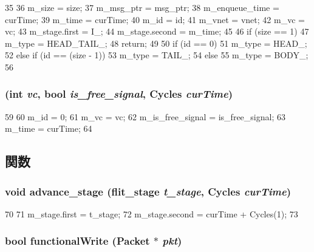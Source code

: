 \begin{DoxyCode}
35 {
36     m_size = size;
37     m_msg_ptr = msg_ptr;
38     m_enqueue_time = curTime;
39     m_time = curTime;
40     m_id = id;
41     m_vnet = vnet;
42     m_vc = vc;
43     m_stage.first = I_;
44     m_stage.second = m_time;
45 
46     if (size == 1) {
47         m_type = HEAD_TAIL_;
48         return;
49     }
50     if (id == 0)
51         m_type = HEAD_;
52     else if (id == (size - 1))
53         m_type = TAIL_;
54     else
55         m_type = BODY_;
56 }
\end{DoxyCode}
\hypertarget{classflit__d_a1056a6d2f4569a75cd6db9b92b2fc0a2}{
\subsubsection[{flit\_\-d}]{ (int {\em vc}, \/  bool {\em is\_\-free\_\-signal}, \/  {\bf Cycles} {\em curTime})}}
\label{classflit__d_a1056a6d2f4569a75cd6db9b92b2fc0a2}



\begin{DoxyCode}
59 {
60     m_id = 0;
61     m_vc = vc;
62     m_is_free_signal = is_free_signal;
63     m_time = curTime;
64 }
\end{DoxyCode}


\subsection{関数}
\hypertarget{classflit__d_a17bbaff3a91e4b25da1d3486641d5e69}{
\subsubsection[{advance\_\-stage}]{\setlength{\rightskip}{0pt plus 5cm}void advance\_\-stage ({\bf flit\_\-stage} {\em t\_\-stage}, \/  {\bf Cycles} {\em curTime})}}
\label{classflit__d_a17bbaff3a91e4b25da1d3486641d5e69}



\begin{DoxyCode}
70     {
71         m_stage.first = t_stage;
72         m_stage.second = curTime + Cycles(1);
73     }
\end{DoxyCode}
\hypertarget{classflit__d_a14bf46f4c6bb79e5357096af6b9dbffa}{
\subsubsection[{functionalWrite}]{\setlength{\rightskip}{0pt plus 5cm}bool functionalWrite ({\bf Packet} $\ast$ {\em pkt})}}
\label{classflit__d_a14bf46f4c6bb79e5357096af6b9dbffa}



